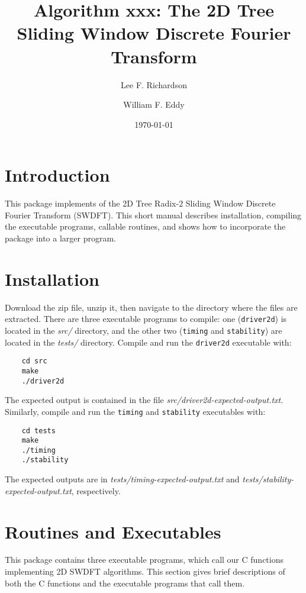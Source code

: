 \documentclass[11pt]{article}
\theoremstyle{definition}
\begin{document}
\title{\large{Algorithm xxx: The 2D Tree Sliding Window Discrete Fourier Transform}}
\author{Lee F. Richardson \and William F. Eddy}
\date{\today}
\maketitle

\section{Introduction}
This package implements of the 2D Tree Radix-2 Sliding Window Discrete Fourier Transform (SWDFT). This short manual describes installation, compiling the executable programs, callable routines, and shows how to incorporate the package into a larger program. 

\section{Installation}
Download the zip file, unzip it, then navigate to the directory where the files are extracted. There are three executable programs to compile: one ({\tt driver2d}) is located in the {\it src/} directory, and the other two ({\tt timing} and {\tt stability}) are located in the {\it tests/} directory. Compile and run the {\tt driver2d} executable with:

\begin{lstlisting}
	cd src
	make 
	./driver2d
\end{lstlisting}

The expected output is contained in the file {\it src/driver2d-expected-output.txt}. Similarly, compile and run the {\tt timing} and {\tt stability} executables with:

\begin{lstlisting}
	cd tests
	make 
	./timing
	./stability
\end{lstlisting}

The expected outputs are in {\it tests/timing-expected-output.txt} and {\it tests/stability-expected-output.txt}, respectively. 

\section{Routines and Executables}
This package contains three executable programs, which call our C functions implementing 2D SWDFT algorithms. This section gives brief descriptions of both the C functions and the executable programs that call them. 
\end{document}
